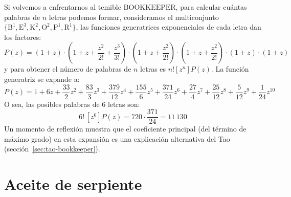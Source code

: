   Si volvemos a enfrentarnos al temible \(\mathrm{BOOKKEEPER}\),
  para calcular cuántas palabras de \(n\) letras podemos formar,
  consideramos el multiconjunto
    \(\{ \mathrm{B}^1, \mathrm{E}^3, \mathrm{K}^2, \mathrm{O}^2,
	 \mathrm{P}^1, \mathrm{R}^1 \}\),
  las funciones generatrices exponenciales
  de cada letra dan los factores:
  \begin{equation*}
    P(z)
      = \left( 1 + z \right)
	  \cdot \left(
		  1 + z + \frac{z^2}{2!} + \frac{z^3}{3!}
		\right)
	  \cdot \left( 1 + z + \frac{z^2}{2!} \right)
	  \cdot \left( 1 + z + \frac{z^2}{2!} \right)
	  \cdot \left( 1 + z \right)
	  \cdot \left( 1 + z \right)
  \end{equation*}
  y para obtener el número de palabras de \(n\) letras es
  \(n! \left[ z^n \right] P(z)\).
  La función generatriz se expande a:
  \begin{equation*}
    P(z)
      = 1 + 6 z + \frac{33}{2} z^2 + \frac{83}{3} z^3
	  + \frac{379}{12} z^4 + \frac{155}{6} z^5
	  + \frac{371}{24} z^6 + \frac{27}{4} z^7
	  + \frac{25}{12} z^8 + \frac{5}{12} z^9
	  + \frac{1}{24} z^{10}
  \end{equation*}
  O sea,
  las posibles palabras de 6 letras son:
  \begin{equation*}
    6! \, \left[ z^6 \right] P(z)
      = 720 \cdot \frac{371}{24}
      = 11\,130
  \end{equation*}
  Un momento de reflexión muestra que el coeficiente principal%
  (del término de máximo grado)
  en esta expansión es una explicación alternativa del Tao
  (sección~\ref{sec:tao-bookkeeper}).

\section{Aceite de serpiente}
\label{sec:snake-oil}

